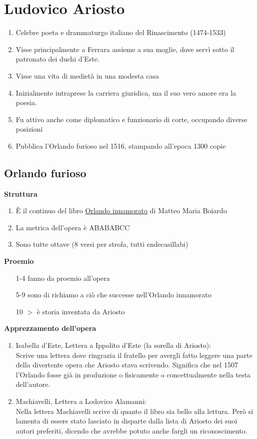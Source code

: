 \documentclass{article}
\begin{document}
\newpage
\section{Ludovico Ariosto}
\begin{enumerate}
    \item Celebre poeta e drammaturgo italiano del Rinascimento (1474-1533)
    \item Visse principalmente a Ferrara assieme a sua moglie, dove servì sotto il patronato dei duchi d'Este.
    \item Visse una vita di medietà in una modesta casa
    \item Inizialmente intraprese la carriera giuridica, ma il suo vero amore era la poesia.
    \item Fu attivo anche come diplomatico e funzionario di corte, occupando diverse posizioni
    \item Pubblica l'Orlando furioso nel 1516, stampando all'epoca 1300 copie
\end{enumerate}

\subsection{Orlando furioso}

\textbf{Struttura}
\begin{enumerate}
    \item È il continuo del libro \underline{Orlando innamorato} di Matteo Maria Boiardo
    \item La metrica dell'opera è ABABABCC
    \item Sono tutte ottave (8 versi per strofa, tutti endecasillabi)
\end{enumerate}

\textbf{Proemio}
\begin{enumerate}
    \item[1-4] fanno da proemio all'opera
    \item[5-9] sono di richiamo a ciò che successe nell'Orlando innamorato
    \item[10 $>$] è storia inventata da Ariosto 
\end{enumerate}

\textbf{Apprezzamento dell'opera}
\begin{enumerate}
    \item Isabella d'Este, Lettera a Ippolito d'Este (la sorella di Ariosto):\\
    Scrive una lettera dove ringrazia il fratello per avergli fatto leggere una parte della 
    divertente opera che Ariosto stava scrivendo. Significa che nel 1507 l'Orlando fosse già 
    in produzione o fisicamente o concettualmente nella testa dell'autore.
    \item Machiavelli, Lettera a Lodovico Alamanni:\\
    Nella lettera Machiavelli scrive di quanto il libro sia bello alla lettura.
    Però si lamenta di essere stato lasciato in disparte dalla lista di Ariosto dei suoi autori 
    preferiti, dicendo che avrebbe potuto anche fargli un riconoscimento.
\end{enumerate}
\end{document}
